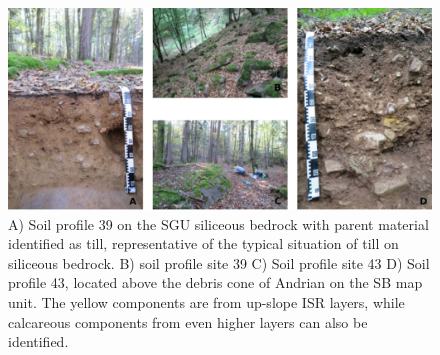\documentclass[preprint,12pt,authoryear]{elsarticle}
\begin{document}
 \begin{figure}[ht!]
\includegraphics[width=\textwidth,angle=0]{soils_red.pdf}
\caption{A) Soil profile 39 on the SGU siliceous bedrock with parent material identified as till, representative of the typical situation of till on siliceous bedrock. B) soil profile site 39 C) Soil profile site 43 D) Soil profile 43, located above the debris cone of Andrian on the SB map unit. The yellow components are from up-slope ISR layers, while calcareous components from even higher layers can also be identified.}
\label{fig:soils}
\end{figure}
\end{document}
